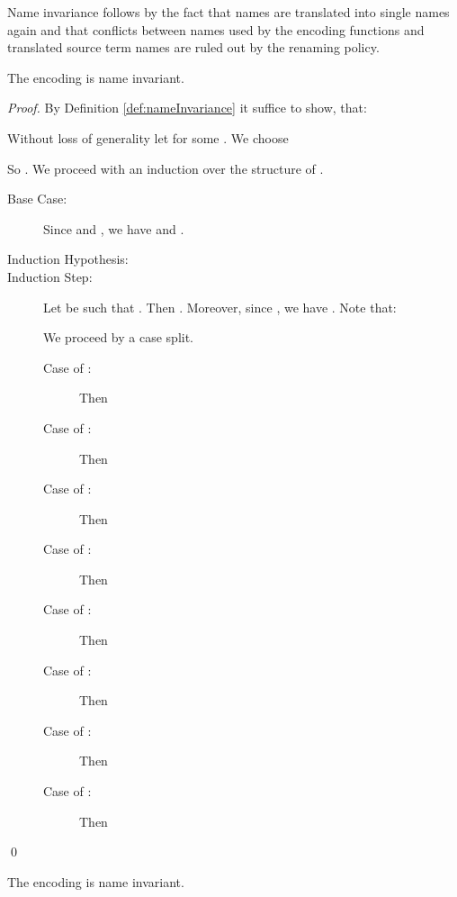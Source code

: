 \documentclass[]{llncs}
\begin{document}
Name invariance follows by the fact that names are translated into single names again and that conflicts between names used by the encoding functions and translated source term names are ruled out by the renaming policy.

\begin{lemma} \label{lem:nameInvarianceSepAsyn}
	The encoding  is name invariant.
\end{lemma}

\begin{proof}
	By Definition \ref{def:nameInvariance} it suffice to show, that:
	
	Without loss of generality let  for some . We choose
	
	So . We proceed with an induction over the structure of .
	\begin{description}
		\item[Base Case:] Since  and , we have  and .
		\item[Induction Hypothesis:] 
		\item[Induction Step:] Let  be such that . Then . Moreover, since , we have . Note that:
			
			We proceed by a case split.
			\begin{description}
				\item[Case of :] Then
					
				\item[Case of :] Then
					
				\item[Case of :] Then
					
				\item[Case of :] Then
					
				\item[Case of :] Then
					
				\item[Case of :] Then
					
				\item[Case of :] Then
					
				\item[Case of :] Then
					
			\end{description}
	\end{description}
	\qed
\end{proof}

\begin{lemma}
	The encoding  is name invariant. \label{lem:nameInvarianceMixAsyn}
\end{lemma}
\end{document}
